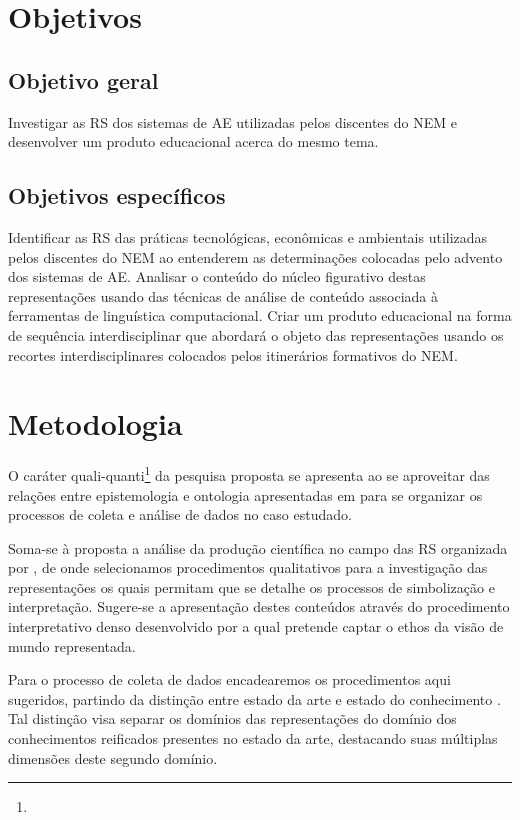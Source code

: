 \documentclass[
  12pt,       %
  openright,      %
  twoside,      %
  a4paper,      %
  english,      %
  french,       %
  spanish,      %
  brazil        %
  ]{abntex2}
\begin{document}
\chapter{Objetivos}
\section{Objetivo geral}

Investigar as RS dos sistemas de AE utilizadas pelos discentes do NEM e desenvolver um produto educacional acerca do mesmo tema.

\section{Objetivos específicos}

Identificar as RS das práticas tecnológicas, econômicas e ambientais utilizadas pelos discentes do NEM ao entenderem as determinações colocadas pelo advento dos sistemas de AE.
Analisar o conteúdo do núcleo figurativo destas representações usando das técnicas de análise de conteúdo associada à ferramentas de linguística computacional.
Criar um produto educacional na forma de sequência interdisciplinar que abordará o objeto das representações usando os recortes interdisciplinares colocados pelos itinerários formativos do NEM.




\chapter{Metodologia}

O caráter quali-quanti\footnote{} da pesquisa proposta se apresenta ao se aproveitar das relações entre epistemologia e ontologia apresentadas em  para se organizar os processos de coleta e análise de dados no caso estudado.

Soma-se à proposta a análise da produção científica no campo das RS organizada por , de onde selecionamos procedimentos qualitativos para a investigação das representações os quais permitam que se detalhe os processos de simbolização e interpretação. Sugere-se a apresentação destes conteúdos através do procedimento interpretativo denso desenvolvido por  a qual pretende captar o ethos da visão de mundo representada.

Para o processo de coleta de dados encadearemos os procedimentos aqui sugeridos, partindo da distinção entre estado da arte e estado do conhecimento . Tal distinção visa separar os domínios das representações do domínio dos conhecimentos reificados presentes no estado da arte, destacando suas múltiplas dimensões deste segundo domínio.
\end{document}
